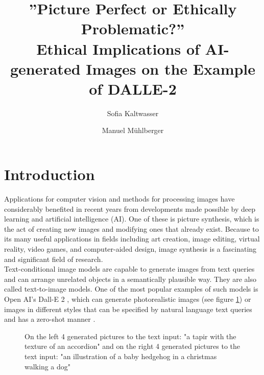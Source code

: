 \documentclass[9.5pt,twocolumn,twoside]{osajnl}
\title{”Picture Perfect or Ethically Problematic?” \\ Ethical Implications of AI-generated Images on the Example of DALLE-2}
\author[1]{Sofia Kaltwasser}
\author[2]{Manuel Mühlberger}
\affil[1]{University of Potsdam}
\affil[2]{TU Munich}
\begin{document}
\maketitle

\section{Introduction}
Applications for computer vision and methods for processing images have considerably benefited in recent years from developments made possible by deep learning and artificial intelligence (AI). One of these is picture synthesis, which is the act of creating new images and modifying ones that already exist. Because to its many useful applications in fields including art creation, image editing, virtual reality, video games, and computer-aided design, image synthesis is a fascinating and significant field of research.\\
Text-conditional image models are capable to generate images from text queries and can arrange unrelated objects in a semantically plausible way. They are also called text-to-image models.
One of the most popular examples of such models is Open AI's Dall-E 2 \cite{DallE}, which can generate photorealistic images (see figure \ref{example}) or images in different styles that can be specified by natural language text queries and has a zero-shot manner \cite{zeroShot}.


\begin{figure}[htbp]
\centering
{}
\caption{On the left 4 generated pictures to the text input: "a tapir with the texture of an accordion" and on the right 4 generated pictures to the text input: "an illustration of a baby hedgehog in a christmas walking a dog" \cite{zeroShot}}
\label{example}
\end{figure}
\end{document}
